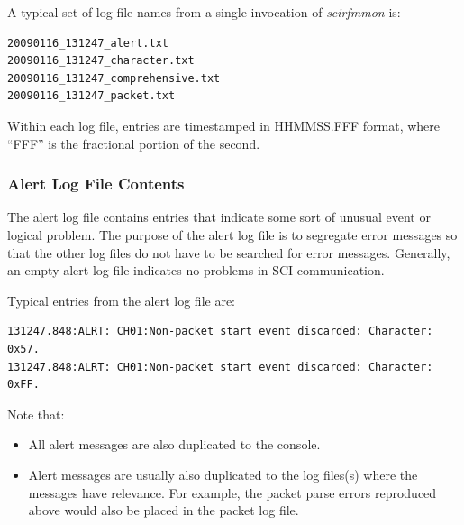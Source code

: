 \documentclass[letterpaper,10pt,titlepage]{article}
\newcommand{\productname}{scirfmmon}
\newcommand{\productnameemph}{\emph{\productname}}
\begin{document}
A typical set of log file names from a single invocation of
\productnameemph{} is:

\begin{verbatim}
20090116_131247_alert.txt
20090116_131247_character.txt
20090116_131247_comprehensive.txt
20090116_131247_packet.txt
\end{verbatim}

Within each log file, entries are timestamped in HHMMSS.FFF format,
where ``FFF'' is the fractional portion of the second.


\subsubsection{Alert Log File Contents}
\label{susg0:slgf0:salf0}

The alert log file contains entries that indicate some sort of 
unusual event or logical problem.  The purpose of the alert log
file is to segregate error messages so that the other log files
do not have to be searched for error messages.  Generally, an
empty alert log file indicates no problems in SCI communication.

Typical entries from the alert log file are:

\begin{small}
\begin{verbatim}
131247.848:ALRT: CH01:Non-packet start event discarded: Character: 0x57.
131247.848:ALRT: CH01:Non-packet start event discarded: Character: 0xFF.
\end{verbatim}
\end{small}

Note that:

\begin{itemize}
\item All alert messages are also duplicated to the console.
\item Alert messages are usually also duplicated to the log files(s) 
      where the messages have relevance.  For example, the packet parse errors
      reproduced above would also be placed in the packet log file.
\end{itemize}


\end{document}
